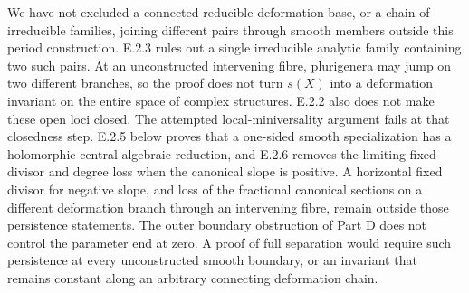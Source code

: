 \begin{problem}
We have not excluded a connected reducible deformation base,
or a chain of irreducible families, joining different pairs
through smooth members outside this period construction.
E.2.3 rules out a single irreducible analytic family containing
two such pairs.  At an unconstructed intervening fibre,
plurigenera may jump on two different branches, so the proof
does not turn $s(X)$ into a deformation invariant on the
entire space of complex structures.  E.2.2 also does not
make these open loci closed.  The attempted local-miniversality
argument fails at that closedness step.  E.2.5 below proves
that a one-sided smooth specialization has a holomorphic
central algebraic reduction, and E.2.6 removes the limiting
fixed divisor and degree loss when the canonical slope is
positive.  A horizontal fixed divisor for negative slope,
and loss of the fractional canonical sections on a different
deformation branch through an intervening fibre, remain
outside those persistence statements.
The outer boundary obstruction of Part D does not control
the parameter end at zero.  A proof of full separation
would require such persistence at every unconstructed
smooth boundary, or an invariant that remains constant
along an arbitrary connecting deformation chain.
\end{problem}




